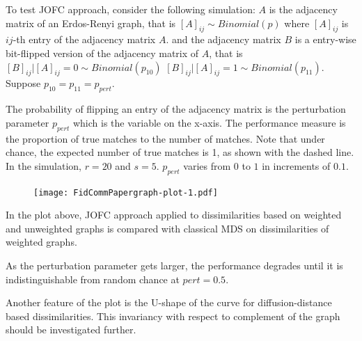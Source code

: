 \documentclass[12pt,oneside,final]{thesis}\usepackage[]{graphicx}\usepackage[]{color}
\begin{document}

 
  To test JOFC approach, consider the following simulation: $A$ is the adjacency matrix of an Erdos-Renyi graph, that is
  $\left[A\right]_{ij} \sim Binomial(p)$ where $\left[A\right]_{ij}$ is $ij$-th entry of the adjacency matrix  $A$.
   and the adjacency matrix  $B$ is a entry-wise bit-flipped version of the adjacency matrix of $A$, that is
    $\left[B\right]_{ij}|\left[A\right]_{ij}=0 \sim Binomial(p_{10})$ $\left[B\right]_{ij}|\left[A\right]_{ij}=1 \sim Binomial(p_{11})$. Suppose $p_{10}=p_{11}=p_{pert}$.
  
  The probability of flipping an entry of the adjacency matrix is the perturbation parameter $p_{pert}$ which is the variable on the x-axis. 
  The performance measure is the proportion of true matches to the number of matches. Note that 
  under chance, the expected number of true matches is 1, as shown with the dashed line. In the simulation, $r=20$ and $s=5$. $p_{pert}$ varies from $0$ to $1$ in increments of $0.1$. 
\begin{figure}
  \texttt{[image: FidCommPapergraph-plot-1.pdf]}
\end{figure}


In the plot above, JOFC approach applied to  dissimilarities based on weighted and unweighted graphs is compared with classical MDS on dissimilarities of weighted graphs.

As the perturbation parameter gets larger, the performance degrades until it is indistinguishable from random chance at $pert=0.5$.

Another feature of the plot is the U-shape of the curve for diffusion-distance based dissimilarities. This invariancy with respect to complement of the graph should be investigated further.
\end{document}

